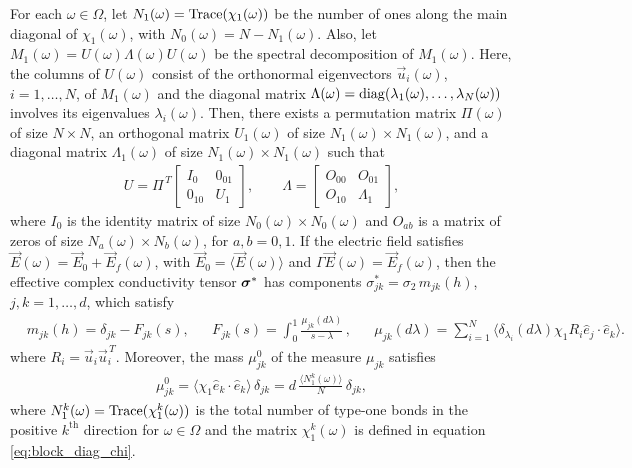 \documentclass{cmslatex}
\newcommand\bsig{\mbox{\boldmath${\sigma}$}}
\begin{document}
\vspace{0.15in}
% 
\begin{theorem}\label{thm:Discrete_Spectral_Theorem_ACM}
  For each $\omega\in\Omega$,  let $N_1(\omega)={\rm Trace}(\chi_1(\omega))$ be the number of
  ones along the main diagonal of $\chi_1(\omega)$, with
  $N_0(\omega)=N-N_1(\omega)$. Also, let $M_1(\omega)=U(\omega)\Lambda(\omega)U(\omega)$ be the spectral
  decomposition of $M_1(\omega)$. Here, the columns of $U(\omega)$ consist of
  the orthonormal eigenvectors $\vec{u}_i(\omega)$, $i=1,\ldots,N$, of $M_1(\omega)$
  and the diagonal matrix $\Lambda(\omega)={\rm diag}(\lambda_1(\omega),\ldots,\lambda_N(\omega))$ involves
  its eigenvalues $\lambda_i(\omega)$. Then, there exists a permutation matrix
  $\Pi(\omega)$ of size $N\times N$, an orthogonal matrix $U_1(\omega)$ of size $N_1(\omega)\times
  N_1(\omega)$, and a diagonal matrix $\Lambda_1(\omega)$ of size $N_1(\omega)\times N_1(\omega)$
  such that       
  \begin{align}\label{eq:Spec_Decomp_chi_Gamma_chi}
U=\Pi^{\,T}\left[
  \begin{array}{ccc}
    I_0&0_{01}\\
    0_{10}&U_1   
    \end{array}
\right],
\qquad
\Lambda=\left[
  \begin{array}{ccc}
    O_{00}&O_{01}\\
    O_{10}&\Lambda_1   
    \end{array}
\right],
  \end{align}
  where $I_0$ is the identity matrix of size $N_0(\omega)\times N_0(\omega)$ and $O_{ab}$
  is a matrix of zeros of size $N_a(\omega)\times N_b(\omega)$, for $a,b=0,1$. 
  If the electric field
  satisfies
  $\vec{E}(\omega)=\vec{E}_0+\vec{E}_f(\omega)$, with $\vec{E}_0=\langle\vec{E}(\omega)\rangle$
  and $\Gamma\vec{E}(\omega)=\vec{E}_f(\omega)$, then the effective complex
  conductivity tensor $\bsig^*$ has components
  $\sigma_{jk}^*=\sigma_2\,m_{jk}(h)$, $j,k=1,\ldots,d$,  which satisfy       
%
\begin{align}\label{eq:Stieltjes_F_Discrete}
  &m_{jk}(h)=\delta_{jk}-F_{jk}(s), 
  &&F_{jk}(s)=\int_0^1\frac{\mu_{jk}(d\lambda)}{s-\lambda}\,, 
  &&\mu_{jk}(d\lambda)=\sum_{i=1}^N\langle \delta_{\lambda_i}(d\lambda)\chi_1R_i\hat{e}_j\cdot\hat{e}_k\rangle.  
\end{align}
%
where $R_i=\vec{u}_i\vec{u}_i^{\,T}$. Moreover, the mass $\mu_{jk}^0$ of the
measure $\mu_{jk}$ satisfies 
%
\begin{align}\label{eq:Measure_Mass_theorem}
  \mu_{jk}^0=\langle\chi_1\hat{e}_k\cdot\hat{e}_k\rangle\,\delta_{jk}=d\,\frac{\langle N_1^k(\omega)\rangle}{N}\,\delta_{jk},
\end{align}
%
where $N_1^k(\omega)={\rm Trace}(\chi_1^k(\omega))$ is the total number of type-one
bonds in the positive $k^{\text{th}}$ direction for $\omega\in\Omega$ and the
matrix $\chi_1^k(\omega)$ is defined in equation \eqref{eq:block_diag_chi}. 
% 
\end{theorem}
\end{document}
